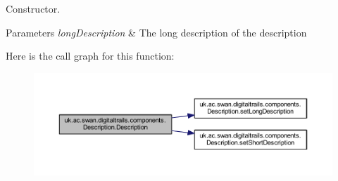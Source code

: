 Constructor. 


\begin{DoxyParams}{Parameters}
{\em long\+Description} & The long description of the description \\
\hline
\end{DoxyParams}


Here is the call graph for this function\+:\nopagebreak
\begin{figure}[H]
\begin{center}
\leavevmode
\includegraphics[width=350pt]{classuk_1_1ac_1_1swan_1_1digitaltrails_1_1components_1_1_description_a98d2a80ad35b07111f5edcc8c741acef_cgraph}
\end{center}
\end{figure}




